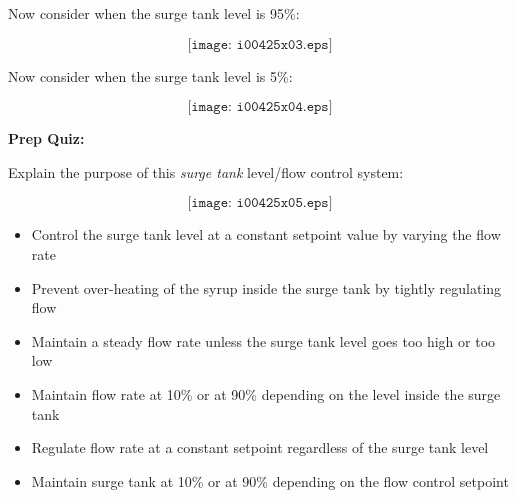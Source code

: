 Now consider when the surge tank level is 95\%:

$$\texttt{[image: i00425x03.eps]}$$

\vskip 10pt

Now consider when the surge tank level is 5\%:

$$\texttt{[image: i00425x04.eps]}$$


\vfil \eject

\noindent
{\bf Prep Quiz:}

Explain the purpose of this {\it surge tank} level/flow control system:

$$\texttt{[image: i00425x05.eps]}$$

\begin{itemize}
\item{} Control the surge tank level at a constant setpoint value by varying the flow rate
\vskip 5pt 
\item{} Prevent over-heating of the syrup inside the surge tank by tightly regulating flow
\vskip 5pt 
\item{} Maintain a steady flow rate unless the surge tank level goes too high or too low
\vskip 5pt 
\item{} Maintain flow rate at 10\% or at 90\% depending on the level inside the surge tank
\vskip 5pt 
\item{} Regulate flow rate at a constant setpoint regardless of the surge tank level
\vskip 5pt 
\item{} Maintain surge tank at 10\% or at 90\% depending on the flow control setpoint
\end{itemize}






